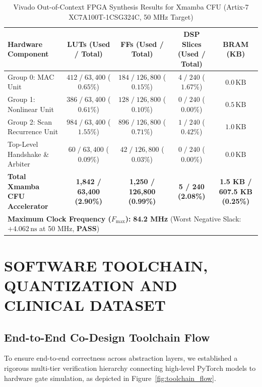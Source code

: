 \documentclass[11pt,a4paper,oneside]{report}
\begin{document}
\begin{table}[!htbp]
\caption[Vivado Out-of-Context FPGA Synthesis Results for Xmamba CFU]{Vivado Out-of-Context FPGA Synthesis Results for Xmamba CFU (Artix-7 XC7A100T-1CSG324C, 50 MHz Target)}
\label{tab:synthesis_resources}
\centering
\begin{tabularx}{\linewidth}{lcccc}
\toprule
\textbf{Hardware Component} & \textbf{LUTs (Used / Total)} & \textbf{FFs (Used / Total)} & \textbf{DSP Slices (Used / Total)} & \textbf{BRAM (KB)} \\
\midrule
Group 0: MAC Unit & $412 \;/\; 63{,}400$ ($0.65\%$) & $184 \;/\; 126{,}800$ ($0.15\%$) & $4 \;/\; 240$ ($1.67\%$) & $0.0\,\text{KB}$ \\
Group 1: Nonlinear Unit & $386 \;/\; 63{,}400$ ($0.61\%$) & $128 \;/\; 126{,}800$ ($0.10\%$) & $0 \;/\; 240$ ($0.00\%$) & $0.5\,\text{KB}$ \\
Group 2: Scan Recurrence Unit & $984 \;/\; 63{,}400$ ($1.55\%$) & $896 \;/\; 126{,}800$ ($0.71\%$) & $1 \;/\; 240$ ($0.42\%$) & $1.0\,\text{KB}$ \\
Top-Level Handshake \& Arbiter & $60 \;/\; 63{,}400$ ($0.09\%$) & $42 \;/\; 126{,}800$ ($0.03\%$) & $0 \;/\; 240$ ($0.00\%$) & $0.0\,\text{KB}$ \\
\midrule
\textbf{Total Xmamba CFU Accelerator} & \textbf{1,842 / 63,400 (2.90\%)} & \textbf{1,250 / 126,800 (0.99\%)} & \textbf{5 / 240 (2.08\%)} & \textbf{1.5 KB / 607.5 KB (0.25\%)} \\
\midrule
\multicolumn{5}{l}{\textbf{Maximum Clock Frequency ($F_{\max}$):} \textbf{84.2 MHz} (Worst Negative Slack: $+4.062\,\text{ns}$ at 50 MHz, \textbf{PASS})} \\
\bottomrule
\end{tabularx}
\end{table}

\chapter{SOFTWARE TOOLCHAIN, QUANTIZATION AND CLINICAL DATASET}
\label{Chapter5}
\rhead{}

\section{End-to-End Co-Design Toolchain Flow}
To ensure end-to-end correctness across abstraction layers, we established a rigorous multi-tier verification hierarchy connecting high-level PyTorch models to hardware gate simulation, as depicted in Figure~\ref{fig:toolchain_flow}.
\end{document}

